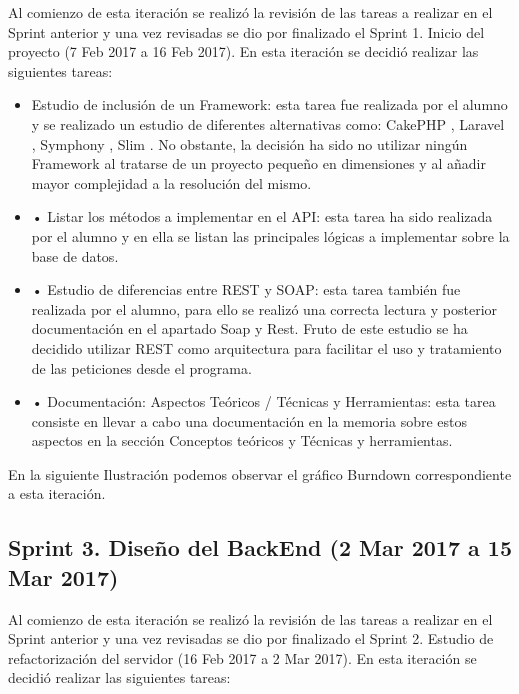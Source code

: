 Al comienzo de esta iteración se realizó la revisión de las tareas a realizar en el Sprint anterior y una vez revisadas se dio por finalizado el Sprint 1. Inicio del proyecto (7 Feb 2017 a 16 Feb 2017). 
En esta iteración se decidió realizar las siguientes tareas:

\begin{itemize}
	
	\item Estudio de inclusión de un Framework: esta tarea fue realizada por el alumno y se realizado un estudio de diferentes alternativas como: CakePHP \cite{wiki:cakephp}, Laravel \cite{wiki:laravel}, Symphony \cite{wiki:symphony}, Slim \cite{wiki:slim}. No obstante, la decisión ha sido no utilizar ningún Framework al tratarse de un proyecto pequeño en dimensiones y al añadir mayor complejidad a la resolución del mismo.
	
	\item •	Listar los métodos a implementar en el API: esta tarea ha sido realizada por el alumno y en ella se listan las principales lógicas a implementar sobre la base de datos.
	
	\item •	Estudio de diferencias entre REST y SOAP: esta tarea también fue realizada por el alumno, para ello se realizó una correcta lectura y posterior documentación en el apartado Soap y Rest. Fruto de este estudio se ha decidido utilizar REST como arquitectura para facilitar el uso y tratamiento de las peticiones desde el programa.
	
	\item •	Documentación: Aspectos Teóricos / Técnicas y Herramientas: esta tarea consiste en llevar a cabo una documentación en la memoria sobre estos aspectos en la sección Conceptos teóricos y Técnicas y herramientas.


\end{itemize}

En la siguiente Ilustración podemos observar el gráfico Burndown correspondiente a esta iteración.


\subsection{Sprint 3. Diseño del BackEnd (2 Mar 2017 a 15 Mar 2017)}

Al comienzo de esta iteración se realizó la revisión de las tareas a realizar en el Sprint anterior y una vez revisadas se dio por finalizado el Sprint 2. Estudio de refactorización del servidor (16 Feb 2017 a 2 Mar 2017).
En esta iteración se decidió realizar las siguientes tareas:

